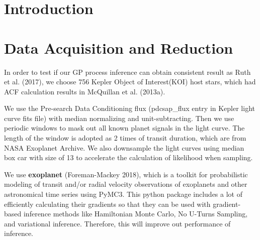 \documentclass{aastex62}
\begin{document}

\section{Introduction} \label{sec:intro}
\section{Data Acquisition and Reduction}
In order to test if our GP process inference can obtain consistent result as Ruth et al. (2017), we choose 756 Kepler Object of Interest(KOI) host stars, which had ACF calculation results in McQuillan et al. (2013a). 

We use the Pre-search Data Conditioning flux (pdcsap\_flux entry in Kepler light curve fits file) with median normalizing and unit-subtracting. Then we use periodic windows to mask out all known planet signals in the light curve. The length of the window is adopted as 2 times of transit duration, which are from NASA Exoplanet Archive. We also downsample the light curves using median box car with size of 13 to accelerate the calculation of likelihood when sampling.

We use \textbf{exoplanet} (Foreman-Mackey 2018), which is a toolkit for probabilistic modeling of transit and/or radial velocity observations of exoplanets and other astronomical time series using PyMC3. This python package includes a lot of  efficiently calculating their gradients so that they can be used with gradient-based inference methods like Hamiltonian Monte Carlo, No U-Turns Sampling, and variational inference. Therefore, this will improve out performance of inference.
\end{document}
